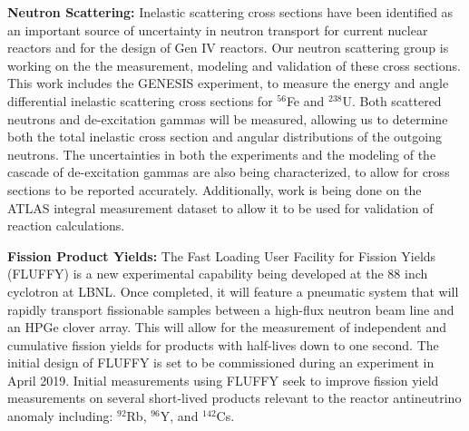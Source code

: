 \textbf{Neutron Scattering:}
Inelastic scattering cross sections have been identified as an important source of uncertainty in neutron transport for current nuclear reactors and for the design of Gen IV reactors. 
Our neutron scattering group is working on the the measurement, modeling and validation of these cross sections. 
This work includes the GENESIS experiment, to measure the energy and angle differential inelastic scattering cross sections for $^{56}$Fe and $^{238}$U. 
Both scattered neutrons and de-excitation gammas will be measured, allowing us to determine both the total inelastic cross section and angular distributions of the outgoing neutrons. 
The uncertainties in both the experiments and the modeling of the cascade of de-excitation gammas are also being characterized, to allow for cross sections to be reported accurately. 
Additionally, work is being done on the ATLAS integral measurement dataset to allow it to be used for validation of reaction calculations.

\textbf{Fission Product Yields:}
The Fast Loading User Facility for Fission Yields (FLUFFY) is a new experimental capability being developed at the 88 inch cyclotron at LBNL.
Once completed, it will feature a pneumatic system that will rapidly transport fissionable samples between a high-flux neutron beam line and an HPGe clover array. 
This will allow for the measurement of independent and cumulative fission yields for products with half-lives down to one second. 
The initial design of FLUFFY is set to be commissioned during an experiment in April 2019. 
Initial measurements using FLUFFY seek to improve fission yield measurements on several short-lived products relevant to the reactor antineutrino anomaly including: $^{92}$Rb, $^{96}$Y, and $^{142}$Cs. 



